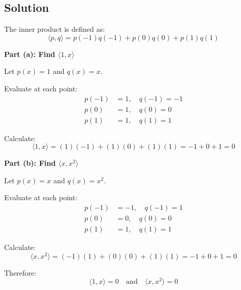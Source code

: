 \subsection*{Solution}

The inner product is defined as:
\[
\langle p, q \rangle = p(-1)q(-1) + p(0)q(0) + p(1)q(1)
\]

\textbf{Part (a): Find $\langle 1, x \rangle$}

Let $p(x) = 1$ and $q(x) = x$.

Evaluate at each point:
\begin{align*}
p(-1) &= 1, \quad q(-1) = -1 \\
p(0) &= 1, \quad q(0) = 0 \\
p(1) &= 1, \quad q(1) = 1
\end{align*}

Calculate:
\[
\langle 1, x \rangle = (1)(-1) + (1)(0) + (1)(1) = -1 + 0 + 1 = 0
\]

\textbf{Part (b): Find $\langle x, x^2 \rangle$}

Let $p(x) = x$ and $q(x) = x^2$.

Evaluate at each point:
\begin{align*}
p(-1) &= -1, \quad q(-1) = 1 \\
p(0) &= 0, \quad q(0) = 0 \\
p(1) &= 1, \quad q(1) = 1
\end{align*}

Calculate:
\[
\langle x, x^2 \rangle = (-1)(1) + (0)(0) + (1)(1) = -1 + 0 + 1 = 0
\]

Therefore:
\[
\langle 1, x \rangle = 0 \quad \text{and} \quad \langle x, x^2 \rangle = 0
\]
